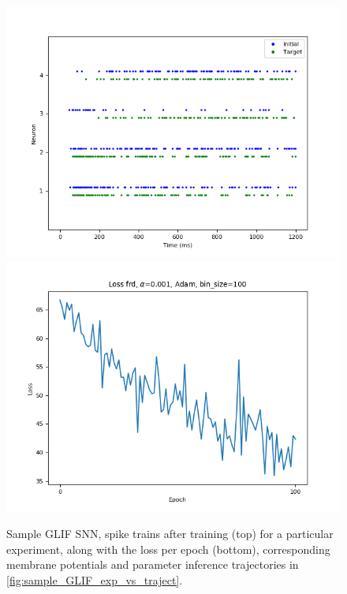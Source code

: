 \documentclass[mphil,deptreport,ianc]{infthesis} %
\begin{document}
\begin{figure}
    \centering
    \vspace{-0.1in}
    \includegraphics[width=0.8\columnwidth]{figures/samples/GLIF/12-09_16-14-54-627/spike_trains_train_iter_100.png}
    \includegraphics[width=0.8\columnwidth]{figures/samples/GLIF/12-09_16-14-54-627/plot_loss_test12-09_16-16-45-54312-09_16-16-45-543.png}
    \vspace{-0.1in}
    \caption{Sample GLIF SNN, spike trains after training (top) for a particular experiment, along with the loss per epoch (bottom), corresponding membrane potentials and parameter inference trajectories in \ref{fig:sample_GLIF_exp_vs_traject}.}
    \label{fig:sample_GLIF_exp}
\end{figure}
\end{document}
